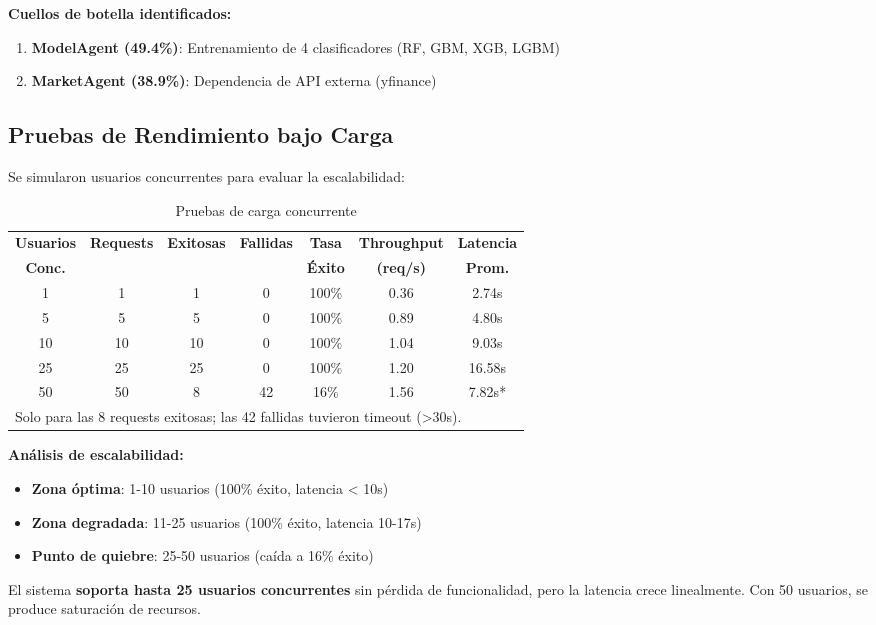 \documentclass[12pt,a4paper]{report}
\begin{document}
\textbf{Cuellos de botella identificados:}
\begin{enumerate}
    \item \textbf{ModelAgent (49.4\%)}: Entrenamiento de 4 clasificadores (RF, GBM, XGB, LGBM)
    \item \textbf{MarketAgent (38.9\%)}: Dependencia de API externa (yfinance)
\end{enumerate}

\subsection{Pruebas de Rendimiento bajo Carga}

Se simularon usuarios concurrentes para evaluar la escalabilidad:

\begin{table}[H]
\centering
\caption{Pruebas de carga concurrente}
\label{tab:carga}
\small
\begin{tabular}{ccccccc}
\toprule
\textbf{Usuarios} & \textbf{Requests} & \textbf{Exitosas} & \textbf{Fallidas} & \textbf{Tasa} & \textbf{Throughput} & \textbf{Latencia} \\
\textbf{Conc.} & & & & \textbf{Éxito} & \textbf{(req/s)} & \textbf{Prom.} \\
\midrule
1 & 1 & 1 & 0 & 100\% & 0.36 & 2.74s \\
5 & 5 & 5 & 0 & 100\% & 0.89 & 4.80s \\
10 & 10 & 10 & 0 & 100\% & 1.04 & 9.03s \\
25 & 25 & 25 & 0 & 100\% & 1.20 & 16.58s \\
50 & 50 & 8 & 42 & 16\% & 1.56 & 7.82s* \\
\bottomrule
\multicolumn{7}{l}{\small *Solo para las 8 requests exitosas; las 42 fallidas tuvieron timeout (>30s).}
\end{tabular}
\end{table}

\textbf{Análisis de escalabilidad:}

\begin{itemize}
    \item \textbf{Zona óptima}: 1-10 usuarios (100\% éxito, latencia < 10s)
    \item \textbf{Zona degradada}: 11-25 usuarios (100\% éxito, latencia 10-17s)
    \item \textbf{Punto de quiebre}: 25-50 usuarios (caída a 16\% éxito)
\end{itemize}

El sistema \textbf{soporta hasta 25 usuarios concurrentes} sin pérdida de funcionalidad, pero la latencia crece linealmente. Con 50 usuarios, se produce saturación de recursos.
\end{document}
